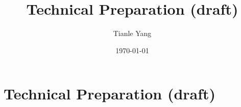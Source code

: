 \documentclass{noteformyself}
\title{Technical Preparation (draft)}
\author{Tianle Yang}
\date{\today}
\begin{document}
    \maketitle

    \section{Technical Preparation (draft)}


\end{document}
